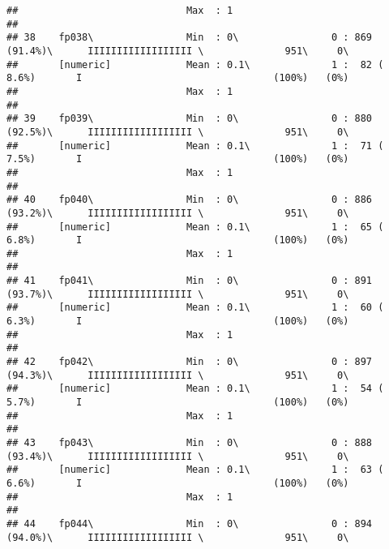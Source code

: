\documentclass[]{article}
\begin{document}
\begin{verbatim}
##                             Max  : 1                                                                                           
## 
## 38    fp038\                Min  : 0\                0 : 869 (91.4%)\      IIIIIIIIIIIIIIIIII \              951\     0\       
##       [numeric]             Mean : 0.1\              1 :  82 ( 8.6%)       I                                 (100%)   (0%)     
##                             Max  : 1                                                                                           
## 
## 39    fp039\                Min  : 0\                0 : 880 (92.5%)\      IIIIIIIIIIIIIIIIII \              951\     0\       
##       [numeric]             Mean : 0.1\              1 :  71 ( 7.5%)       I                                 (100%)   (0%)     
##                             Max  : 1                                                                                           
## 
## 40    fp040\                Min  : 0\                0 : 886 (93.2%)\      IIIIIIIIIIIIIIIIII \              951\     0\       
##       [numeric]             Mean : 0.1\              1 :  65 ( 6.8%)       I                                 (100%)   (0%)     
##                             Max  : 1                                                                                           
## 
## 41    fp041\                Min  : 0\                0 : 891 (93.7%)\      IIIIIIIIIIIIIIIIII \              951\     0\       
##       [numeric]             Mean : 0.1\              1 :  60 ( 6.3%)       I                                 (100%)   (0%)     
##                             Max  : 1                                                                                           
## 
## 42    fp042\                Min  : 0\                0 : 897 (94.3%)\      IIIIIIIIIIIIIIIIII \              951\     0\       
##       [numeric]             Mean : 0.1\              1 :  54 ( 5.7%)       I                                 (100%)   (0%)     
##                             Max  : 1                                                                                           
## 
## 43    fp043\                Min  : 0\                0 : 888 (93.4%)\      IIIIIIIIIIIIIIIIII \              951\     0\       
##       [numeric]             Mean : 0.1\              1 :  63 ( 6.6%)       I                                 (100%)   (0%)     
##                             Max  : 1                                                                                           
## 
## 44    fp044\                Min  : 0\                0 : 894 (94.0%)\      IIIIIIIIIIIIIIIIII \              951\     0\       

\end{verbatim}
\end{document}
